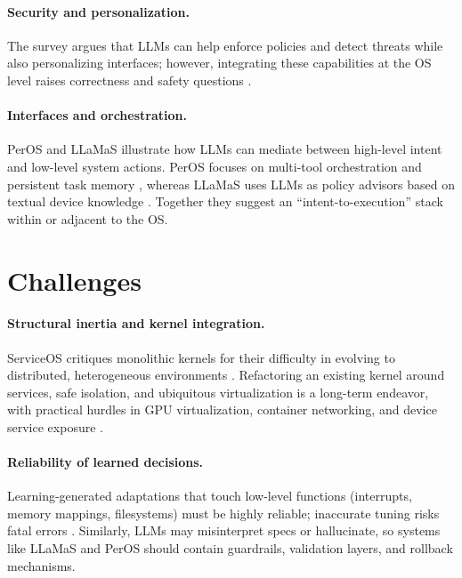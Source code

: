 \documentclass{article}
\begin{document}
\paragraph{Security and personalization.}
The survey argues that LLMs can help enforce policies and detect threats while also personalizing interfaces; however, integrating these capabilities at the OS level raises correctness and safety questions \cite{zhang2024systematic}. %

\paragraph{Interfaces and orchestration.}
PerOS and LLaMaS illustrate how LLMs can mediate between high-level intent and low-level system actions. PerOS focuses on multi-tool orchestration and persistent task memory \cite{he2024peros}, whereas LLaMaS uses LLMs as policy advisors based on textual device knowledge \cite{kamath2024llamas}. Together they suggest an ``intent-to-execution'' stack within or adjacent to the OS.

\section{Challenges}
\paragraph{Structural inertia and kernel integration.}
ServiceOS critiques monolithic kernels for their difficulty in evolving to distributed, heterogeneous environments \cite{liu2021serviceos}. %
Refactoring an existing kernel around services, safe isolation, and ubiquitous virtualization is a long-term endeavor, with practical hurdles in GPU virtualization, container networking, and device service exposure \cite{liu2021serviceos}. %

\paragraph{Reliability of learned decisions.}
Learning-generated adaptations that touch low-level functions (interrupts, memory mappings, filesystems) must be highly reliable; inaccurate tuning risks fatal errors \cite{liu2021serviceos}. %
Similarly, LLMs may misinterpret specs or hallucinate, so systems like LLaMaS and PerOS should contain guardrails, validation layers, and rollback mechanisms.
\end{document}
